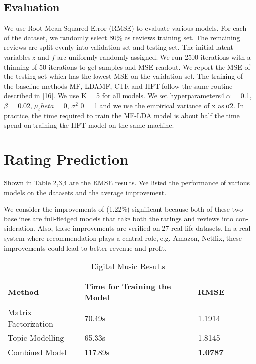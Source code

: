 \documentclass[10pt,conference]{IEEEtran}
\begin{document}
\subsection{Evaluation}
We use Root Mean Squared Error (RMSE) to evaluate various models.
For each of the dataset, we randomly select 80\% as reviews training set. The remaining reviews are split evenly into validation set and testing set. The initial latent variables $z$ and $f$ are uniformly randomly assigned. We run 2500 iterations with a thinning of 50 iterations to get samples and MSE readout. We report the MSE of the testing set which has the lowest MSE on the validation set. The training of the baseline methods MF, LDAMF, CTR and HFT follow the same routine described in [16]. We use K = 5 for all models. We set hyperparameters4 $\alpha$ = 0.1, $\beta$ = 0.02, $\mu_theta$ = 0, $\sigma^2$ 0 = 1 and we use the empirical variance of x as σ2. In practice, the time required to train the MF-LDA model is about half the time spend on training the HFT model on the same machine.

\section{Rating Prediction}

Shown in Table 2,3,4 are the RMSE results. We listed the performance of various models on the datasets and the average improvement.

We consider the improvements of (1.22\%) significant because both of these​ two baselines are full-fledged models that take both the ratings and reviews into con- sideration. Also, these improvements are verified on 27 r​eal-life datasets. In a real system where recommendation plays a central ro​le, e.g. Amazon, Netflix, these ​improvements could le​ad to better revenue and profit.	


\begin{table}[h]
\centering
\caption{Digital Music Results}
\label{Digital Music Results}
\begin{tabular}{ llllll }
\toprule
\textbf{Method} & \textbf{Time for Training the Model} & \textbf{RMSE} \\
\midrule
Matrix Factorization & 70.49s & 1.1914 \\
\hline
Topic Modelling & 65.33s & 1.8145 \\
\hline
Combined Model & 117.89s  & \textbf{1.0787} \\ 
\bottomrule
\end{tabular}
\end{table}
\end{document}
